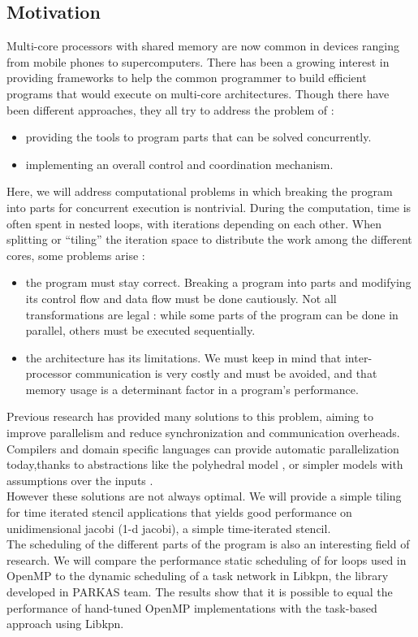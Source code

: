 \documentclass[a4paper,11pt]{article}
\begin{document}
\subsection{Motivation}
Multi-core processors with shared memory are now common in devices ranging from mobile
phones to supercomputers. There has been a growing interest in providing frameworks
to help the common programmer to build efficient programs that would execute
on multi-core architectures. Though there have been different approaches, they all try to
address the problem of :
\begin{itemize}
 \item  providing the tools to program parts that can be solved concurrently.
 \item  implementing an overall control and coordination mechanism.
\end{itemize}
Here, we will address computational problems in which breaking the program into parts for
concurrent execution is nontrivial. During the computation, time is often spent in nested
loops, with iterations depending on each other. When splitting or “tiling” the iteration space to 
distribute the work among the different cores, some problems arise :
\begin{itemize}
 \item the program must stay correct. Breaking a program into parts and modifying its control flow
 and data flow must be done cautiously. Not all transformations are legal : while some parts of the
 program can be done in parallel, others must be executed sequentially.
 \item the architecture has its limitations. We must keep in mind that inter-processor 
 communication is very costly and must be avoided, and that memory usage is a determinant 
 factor in a program's performance.
\end{itemize}
Previous research has provided many solutions to this problem, aiming to improve 
parallelism and reduce synchronization and communication overheads. Compilers and domain
specific languages can provide automatic parallelization today,thanks to abstractions like 
the polyhedral model \cite{bondhugula_automatic_2008}, or simpler models with assumptions 
over the inputs \cite{ragan-kelley_halide:_2013}. \\
However these solutions are not always optimal.
We will provide a simple tiling for time iterated stencil applications that yields good
performance on unidimensional jacobi (1-d jacobi), a simple time-iterated stencil. \\
The scheduling of the different parts of the program is also an interesting field of research.
We will compare the performance static scheduling of for loops used in OpenMP to the
dynamic scheduling of a task network in Libkpn, the library developed in PARKAS team.
The results show that it is possible to equal the performance of hand-tuned OpenMP implementations
with the task-based approach using Libkpn.
\end{document}
